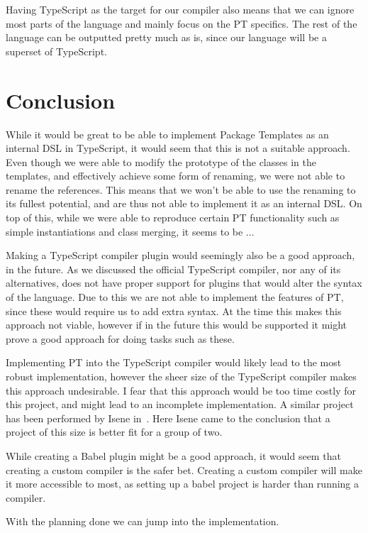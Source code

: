 Having TypeScript as the target for our compiler also means that we can ignore most parts of the language and mainly focus on the PT specifics.
The rest of the language can be outputted pretty much as is, since our language will be a superset of TypeScript.


\section{Conclusion}\label{sec:planning-conclusion}


While it would be great to be able to implement Package Templates as an internal DSL in TypeScript, it would seem that this is not a suitable approach.
Even though we were able to modify the prototype of the classes in the templates, and effectively achieve some form of renaming, we were not able to rename the references.
This means that we won't be able to use the renaming to its fullest potential, and are thus not able to implement it as an internal DSL\@.
On top of this, while we were able to reproduce certain PT functionality such as simple instantiations and class merging, it seems to be ... %

Making a TypeScript compiler plugin would seemingly also be a good approach, in the future.
As we discussed the official TypeScript compiler, nor any of its alternatives, does not have proper support for plugins that would alter the syntax of the language.
Due to this we are not able to implement the features of PT, since these would require us to add extra syntax.
At the time this makes this approach not viable, however if in the future this would be supported it might prove a good approach for doing tasks such as these.

Implementing PT into the TypeScript compiler would likely lead to the most robust implementation, however the sheer size of the TypeScript compiler makes this approach undesirable.
I fear that this approach would be too time costly for this project, and might lead to an incomplete implementation.
A similar project has been performed by Isene in~\cite{Isene2018}.
Here Isene came to the conclusion that a project of this size is better fit for a group of two.

While creating a Babel plugin might be a good approach, it would seem that creating a custom compiler is the safer bet.
Creating a custom compiler will make it more accessible to most, as setting up a babel project is harder than running a compiler.

With the planning done we can jump into the implementation.